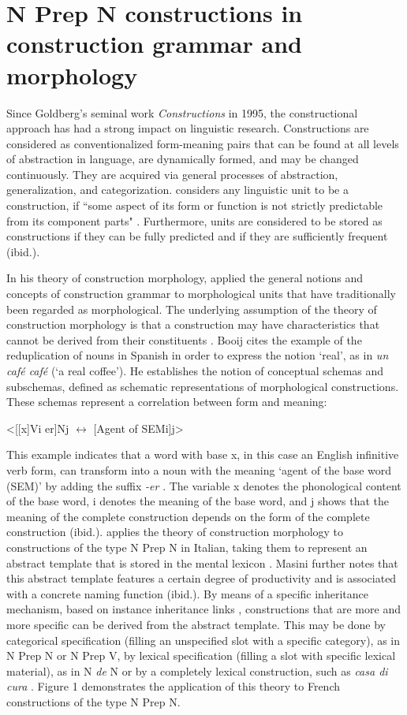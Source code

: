 \documentclass[output=paper]{langsci/langscibook}
\begin{document}
\section{N Prep N constructions in construction grammar and morphology}
Since Goldberg’s seminal work \textit{Constructions} in 1995, the constructional approach has had a strong impact on linguistic research. Constructions are considered as conventionalized form-meaning pairs that can be found at all levels of abstraction in language, are dynamically formed, and may be changed continuously. They are acquired via general processes of abstraction, generalization, and categorization. \citet{Goldberg:2006} considers any linguistic unit to be a construction, if ``some aspect of its form or function is not strictly predictable from its component parts" \citep[5]{Goldberg:2006}. Furthermore, units are considered to be stored as constructions if they can be fully predicted and if they are sufficiently frequent (ibid.).

In his theory of construction morphology, \citet{Booij:2015} applied the general notions and concepts of construction grammar to morphological units that have traditionally been regarded as morphological. The underlying assumption of the theory of construction morphology is that a construction may have characteristics that cannot be derived from their constituents \citep[3]{Booij:2015}. Booij cites the example of the reduplication of nouns in Spanish in order to express the notion `real', as in \textit{un café café} (`a real coffee'). He establishes the notion of conceptual schemas and subschemas, defined as schematic representations of morphological constructions. These schemas represent a correlation between form and meaning:

<[[x]Vi er]Nj $\leftrightarrow$ [Agent of SEMi]j>		\citep[2]{Booij:2015}

This example indicates that a word with base x, in this case an English infinitive verb form, can transform into a noun with the meaning `agent of the base word (SEM)' by adding the suffix \textit{-er} \citep[2]{Booij:2015}. The variable x denotes the phonological content of the base word, i denotes the meaning of the base word, and j shows that the meaning of the complete construction depends on the form of the complete construction (ibid.). \citet{Masini:2009} applies the theory of construction morphology to constructions of the type N Prep N in Italian, taking them to represent an abstract template that is stored in the mental lexicon \citep[261]{Masini:2009}. Masini further notes that this abstract template features a certain degree of productivity and is associated with a concrete naming function (ibid.). By means of a specific inheritance mechanism, based on instance inheritance links \citep{Goldberg:1995}, constructions that are more and more specific can be derived from the abstract template. This may be done by categorical specification (filling an unspecified slot with a specific category), as in N Prep N or N Prep V, by lexical specification (filling a slot with specific lexical material), as in N \textit{de} N or by a completely lexical construction, such as \textit{casa di cura} \citep[261]{Masini:2009}. Figure 1 demonstrates the application of this theory to French constructions of the type N Prep N.
\end{document}
